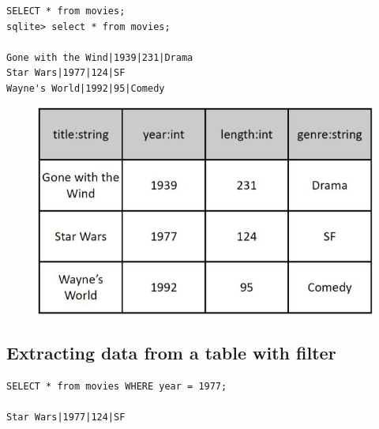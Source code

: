 \documentclass[conference]{IEEEtran}
\begin{document}
\begin{verbatim}
SELECT * from movies;
sqlite> select * from movies;

Gone with the Wind|1939|231|Drama
Star Wars|1977|124|SF
Wayne's World|1992|95|Comedy
\end{verbatim}
\begin{figure} [h!]
    \centering
    \includegraphics[scale=0.5]{Ex17.JPG}
\end{figure}

\subsection{Extracting data from a table with filter}

\begin{verbatim}
SELECT * from movies WHERE year = 1977;

Star Wars|1977|124|SF
\end{verbatim}




\end{document}
